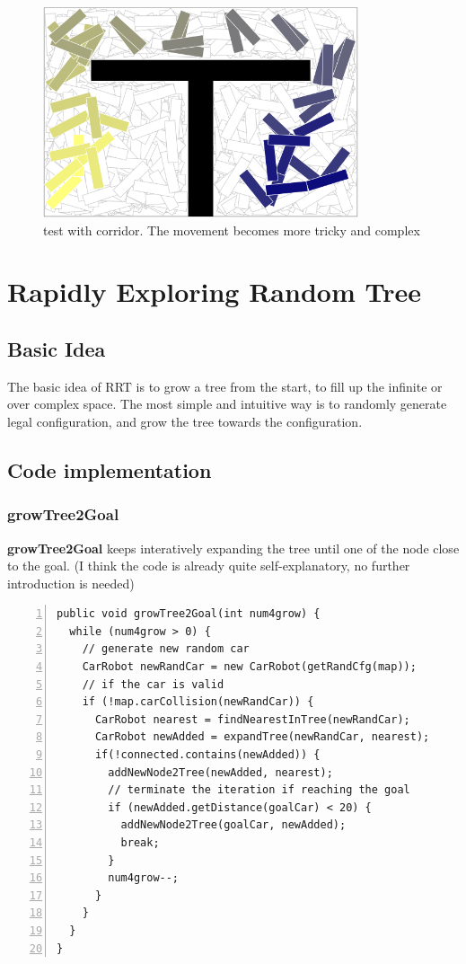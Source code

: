 \documentclass{article}
\begin{document}
\begin{figure}[!h]
\centering
\includegraphics[width=0.827\textwidth]{1-2.png}
\caption{test with corridor. The movement becomes more tricky and complex}
\label{1-2}
\end{figure}






\clearpage
\section{Rapidly Exploring Random Tree}
\subsection{Basic Idea}
The basic idea of RRT is to grow a tree from the start, to fill up the infinite or over complex space. The most simple and intuitive way is to randomly generate legal configuration, and grow the tree towards the configuration. 





\subsection{Code implementation}


\subsubsection{growTree2Goal}

\textbf{growTree2Goal} keeps interatively expanding the tree until one of the node close to the goal. (I think the code is already quite self-explanatory, no further introduction is needed) 

\begin{lstlisting}[numbers=left]
public void growTree2Goal(int num4grow) {
  while (num4grow > 0) {
    // generate new random car
    CarRobot newRandCar = new CarRobot(getRandCfg(map));
    // if the car is valid
    if (!map.carCollision(newRandCar)) {
      CarRobot nearest = findNearestInTree(newRandCar);
      CarRobot newAdded = expandTree(newRandCar, nearest);
      if(!connected.contains(newAdded)) {
        addNewNode2Tree(newAdded, nearest);
        // terminate the iteration if reaching the goal
        if (newAdded.getDistance(goalCar) < 20) {
          addNewNode2Tree(goalCar, newAdded);
          break;
        }
        num4grow--;
      }
    }
  }
}
\end{lstlisting}
\end{document}
